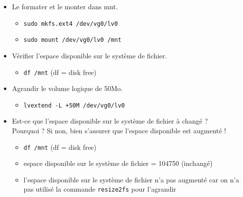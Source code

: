 \documentclass[a4paper]{article}
\begin{document}
\begin{itemize}
\item Le formater et le monter dans mnt.
\begin{example}
    \begin{itemize}
        \item \texttt{sudo mkfs.ext4 /dev/vg0/lv0}
        \item \texttt{sudo mount /dev/vg0/lv0 /mnt}
    \end{itemize}
\end{example}

\item Vérifier l'espace disponible sur le système de fichier.
\begin{example}
    \begin{itemize}
        \item \texttt{df /mnt} (df = disk free)
    \end{itemize}
\end{example}

\item Agrandir le volume logique de 50Mo.
\begin{example}
    \begin{itemize}
        \item \texttt{lvextend -L +50M /dev/vg0/lv0}
    \end{itemize}
\end{example}

\item Est-ce que l'espace disponible sur le système de fichier à changé ? \\
Pourquoi ? Si non, bien s'assurer que l'espace disponible est augmenté !
\begin{example}
    \begin{itemize}
        \item \texttt{df /mnt} (df = disk free)
        \item espace disponible sur le système de fichier = 104750 (inchangé)
        \item l'espace disponible sur le système de fichier n'a pas augmenté car on n'a pas utilisé la commande \texttt{resize2fs} pour l'agrandir
    \end{itemize}
\end{example}


\end{itemize}
\end{document}
